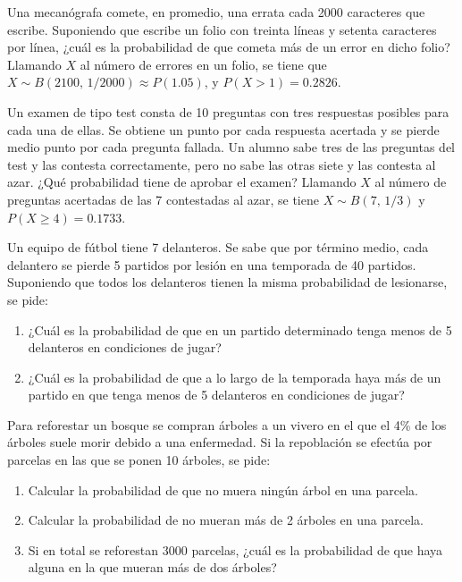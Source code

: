{Una mecanógrafa comete, en promedio, una errata cada 2000 caracteres que escribe.
Suponiendo que escribe un folio con treinta líneas y setenta caracteres por línea, ¿cuál es la probabilidad de que
cometa más de un error en dicho folio?}
{Llamando $X$ al número de errores en un folio, se tiene que $X\sim B(2100,\,1/2000)\approx P(1.05)$, y $P(X>1)=0.2826$.
}
{}


{Un examen de tipo test consta de 10 preguntas con tres respuestas posibles para cada una de ellas.
Se obtiene un punto por cada respuesta acertada y se pierde medio punto por cada pregunta fallada.
Un alumno sabe tres de las preguntas del test y las contesta correctamente, pero no sabe las otras siete y las contesta
al azar.
¿Qué probabilidad tiene de aprobar el examen?}
{Llamando $X$ al número de preguntas acertadas de las 7 contestadas al azar, se tiene $X\sim B(7,\,1/3)$ y $P(X\geq
4)=0.1733$.}
{}


{Un equipo de fútbol tiene 7 delanteros. Se sabe que por término medio, cada delantero se pierde 5 partidos por lesión en una temporada de 40 partidos. Suponiendo que todos los delanteros tienen la misma probabilidad de lesionarse, se pide:
\begin{enumerate}
\item  ¿Cuál es la probabilidad de que en un partido determinado tenga menos de 5 delanteros en condiciones de jugar?
\item  ¿Cuál es la probabilidad de que a lo largo de la temporada haya más de un partido en que tenga menos de 5  delanteros en condiciones de jugar?
\end{enumerate}
}
{}
{}


{Para reforestar un bosque se compran árboles a un vivero en el que el 4\% de los árboles suele morir debido a una enfermedad. Si la repoblación se efectúa por parcelas en las que se ponen 10 árboles, se pide:
\begin{enumerate}
\item Calcular la probabilidad de que no muera ningún árbol en una parcela.
\item Calcular la probabilidad de no mueran más de 2 árboles en una parcela.
\item Si en total se reforestan 3000 parcelas, ¿cuál es la probabilidad de que haya alguna en la que mueran más de dos árboles?
\end{enumerate}
}
{}
{}


